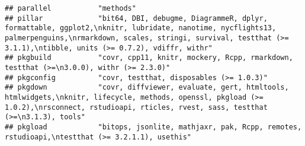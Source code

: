 \documentclass[
]{article}
\begin{document}
\begin{verbatim}
## parallel           "methods"                                                                                                                                                                                                                                                                                                                                                                                                                                                                         
## pillar             "bit64, DBI, debugme, DiagrammeR, dplyr, formattable, ggplot2,\nknitr, lubridate, nanotime, nycflights13, palmerpenguins,\nrmarkdown, scales, stringi, survival, testthat (>= 3.1.1),\ntibble, units (>= 0.7.2), vdiffr, withr"                                                                                                                                                                                                                                                   
## pkgbuild           "covr, cpp11, knitr, mockery, Rcpp, rmarkdown, testthat (>=\n3.0.0), withr (>= 2.3.0)"                                                                                                                                                                                                                                                                                                                                                                                            
## pkgconfig          "covr, testthat, disposables (>= 1.0.3)"                                                                                                                                                                                                                                                                                                                                                                                                                                          
## pkgdown            "covr, diffviewer, evaluate, gert, htmltools, htmlwidgets,\nknitr, lifecycle, methods, openssl, pkgload (>= 1.0.2),\nrsconnect, rstudioapi, rticles, rvest, sass, testthat (>=\n3.1.3), tools"                                                                                                                                                                                                                                                                                    
## pkgload            "bitops, jsonlite, mathjaxr, pak, Rcpp, remotes, rstudioapi,\ntestthat (>= 3.2.1.1), usethis"                                                                                                                                                                                                                                                                                                                                                                                     

\end{verbatim}
\end{document}
